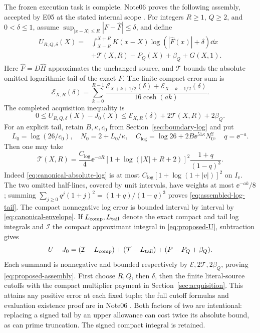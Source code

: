 The frozen execution task \cite{OGAssembly} is complete.
Note06 proves the following assembly, accepted by E05 at the
stated internal scope \cite{OGAssemblyProof,OGAssemblyAssessment}.
For integers \(R\ge1\), \(Q\ge2\), and \(0<\delta\le1\), assume
\(\sup_{|x-X|\le R}|F-\widehat F|\le\delta\), and define
\begin{align}\label{eq:proposed-U}
 U_{R,Q,\delta}(X)
 ={}&\int_{X-R}^{X+R}K(x-X)\log(|\widehat F(x)|+\delta)\dd x
 \nonumber\\
 &+\mathcal T(X,R)-P_Q(X)+\beta_Q+G(X,1).
\end{align}
Here \(\widehat F=D\widehat H\) approximates the unchanged source,
and \(\mathcal T\) bounds the absolute omitted logarithmic tail
of the exact \(F\). The finite compact error sum is
\[
 \mathcal E_{X,R}(\delta)=
 \sum_{k=0}^{R-1}
 \frac{\mathcal E_{X+k+1/2}(\delta)+
       \mathcal E_{X-k-1/2}(\delta)}{16\cosh(ak)}.
\]
The completed acquisition inequality is
\begin{equation}\label{eq:proposed-assembly}
 0\le U_{R,Q,\delta}(X)-J_0(X)
 \le\mathcal E_{X,R}(\delta)+2\mathcal T(X,R)+2\beta_Q.
\end{equation}
For an explicit tail, retain \(B,\kappa,c_0\) from
Section~\ref{sec:boundary-log} and put
\[
 L_0=\log(26/c_0),\quad N_0=2+L_0/\kappa,\quad
 C_{\log}=\log26+2B\ee^{51\kappa}N_0^2,\quad q=\ee^{-a}.
\]
Then one may take
\begin{equation}\label{eq:assembled-log-tail}
 \mathcal T(X,R)=\frac{C_{\log}}4\ee^{-aR}
 [1+\log(|X|+R+2)]^2\frac{1+q}{(1-q)^3}.
\end{equation}
Indeed \eqref{eq:canonical-absolute-log} is at most
\(C_{\log}[1+\log(1+|v|)]^2\) on \(I_v\).
The two omitted half-lines, covered by unit intervals, have weights
at most \(\ee^{-ak}/8\); summing
\(\sum_{j\ge0}q^j(1+j)^2=(1+q)/(1-q)^3\) proves
\eqref{eq:assembled-log-tail}. The compact nonnegative log error
is bounded interval by interval by
\eqref{eq:canonical-envelope}. If \(L_{\rm comp},L_{\rm tail}\)
denote the exact compact and tail log integrals and \(\mathcal I\)
the compact approximant integral in \eqref{eq:proposed-U}, subtraction gives
\[
 U-J_0=(\mathcal I-L_{\rm comp})+
       (\mathcal T-L_{\rm tail})+(P-P_Q+\beta_Q).
\]
Each summand is nonnegative and bounded respectively by
\(\mathcal E,2\mathcal T,2\beta_Q\), proving
\eqref{eq:proposed-assembly}. First choose \(R,Q\), then \(\delta\),
then the finite literal-source cutoffs with the compact multiplier
payment in Section~\ref{sec:acquisition}. This attains any positive
error at each fixed tuple; the full cutoff formulas and evaluation
existence proof are in Note06 \cite{OGAssemblyProof}.
Both factors of two are intentional: replacing a signed tail by an
upper allowance can cost twice its absolute bound, as can prime
truncation. The signed compact integral is retained.

